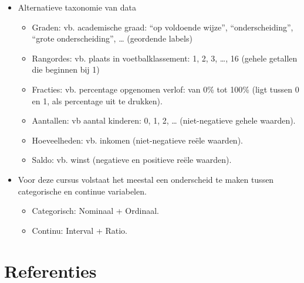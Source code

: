 \documentclass[]{tufte-book}
\providecommand{\tightlist}{%
  \setlength{\itemsep}{0pt}\setlength{\parskip}{0pt}}
\begin{document}
\begin{itemize}
\tightlist
\item
  Alternatieve taxonomie van data

  \begin{itemize}
  \tightlist
  \item
    Graden: vb. academische graad: ``op voldoende wijze'', ``onderscheiding'', ``grote onderscheiding'', \ldots{} (geordende labels)
  \item
    Rangordes: vb. plaats in voetbalklassement: 1, 2, 3, \ldots, 16 (gehele getallen die beginnen bij 1)
  \item
    Fracties: vb. percentage opgenomen verlof: van 0\% tot 100\% (ligt tussen 0 en 1, als percentage uit te drukken).
  \item
    Aantallen: vb aantal kinderen: 0, 1, 2, \ldots{} (niet-negatieve gehele waarden).
  \item
    Hoeveelheden: vb. inkomen (niet-negatieve reële waarden).
  \item
    Saldo: vb. winst (negatieve en positieve reële waarden).
  \end{itemize}
\item
  Voor deze cursus volstaat het meestal een onderscheid te maken tussen categorische en continue variabelen.

  \begin{itemize}
  \tightlist
  \item
    Categorisch: Nominaal + Ordinaal.
  \item
    Continu: Interval + Ratio.
  \end{itemize}
\end{itemize}

\hypertarget{referenties}{%
\section{Referenties}\label{referenties}}
\end{document}

